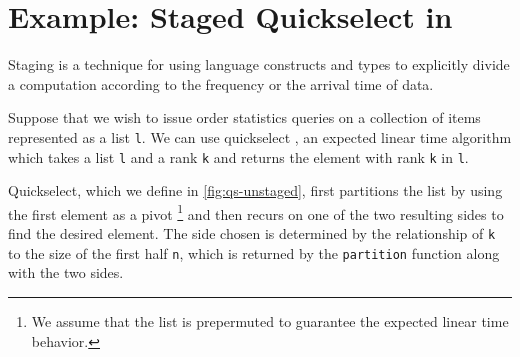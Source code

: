 \section {Example: Staged Quickselect in \texorpdfstring{\lang}{λ12}}
\label{sec:staging}





Staging is a technique for using language constructs and types to
explicitly divide a computation according to the frequency or the
arrival time of data.  

Suppose that we wish to issue order statistics queries on a collection of items
represented as a list \texttt{l}. We can use quickselect \cite{quickselect}, an
expected linear time algorithm which takes a list \texttt{l} and a rank
\texttt{k} and returns the element with rank \texttt{k} in \texttt{l}.

Quickselect, which we define in \ref{fig:qs-unstaged}, first partitions the list
by using the first element as a pivot%
\footnote{We assume that the list is prepermuted to guarantee the expected
linear time behavior.}
and then recurs on one of the two resulting sides to find the desired element. The
side chosen is determined by the relationship of \texttt{k} to the size of the
first half \texttt{n}, which is returned by the \texttt{partition} function
along with the two sides.

